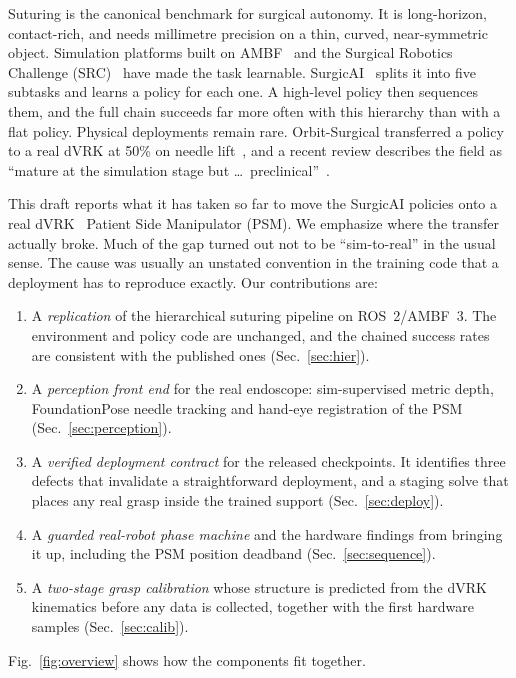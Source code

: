 \documentclass[letterpaper, 10 pt, conference]{ieeeconf}  %
\begin{document}
Suturing is the canonical benchmark for surgical autonomy. It is long-horizon,
contact-rich, and needs millimetre precision on a thin, curved,
near-symmetric object. Simulation platforms built on AMBF~\cite{munawar2019ambf}
and the Surgical Robotics Challenge (SRC)~\cite{munawar2022src} have made the
task learnable. SurgicAI~\cite{wu2024surgicai} splits it into five subtasks and
learns a policy for each one. A high-level policy then sequences them, and the
full chain succeeds far more often with this hierarchy than with a flat policy.
Physical deployments remain rare. Orbit-Surgical transferred a policy to a real
dVRK at 50\% on needle lift~\cite{yu2024orbit}, and a recent review describes the
field as ``mature at the simulation stage but \ldots\ preclinical''~\cite{review2026rl}.

This draft reports what it has taken so far to move the SurgicAI policies onto a
real dVRK~\cite{kazanzides2014dvrk} Patient Side Manipulator (PSM). We emphasize
where the transfer actually broke. Much of the gap turned out not to be
``sim-to-real'' in the usual sense. The cause was usually an unstated convention
in the training code that a deployment has to reproduce exactly. Our
contributions are:
\begin{enumerate}
\item A \emph{replication} of the hierarchical suturing pipeline on ROS~2/AMBF~3.
      The environment and policy code are unchanged, and the chained success rates
      are consistent with the published ones (Sec.~\ref{sec:hier}).
\item A \emph{perception front end} for the real endoscope: sim-supervised metric
      depth, FoundationPose needle tracking and hand-eye registration of the PSM
      (Sec.~\ref{sec:perception}).
\item A \emph{verified deployment contract} for the released checkpoints. It
      identifies three defects that invalidate a straightforward deployment, and
      a staging solve that places any real grasp inside the trained support
      (Sec.~\ref{sec:deploy}).
\item A \emph{guarded real-robot phase machine} and the hardware findings from
      bringing it up, including the PSM position deadband
      (Sec.~\ref{sec:sequence}).
\item A \emph{two-stage grasp calibration} whose structure is predicted from the
      dVRK kinematics before any data is collected, together with the first
      hardware samples (Sec.~\ref{sec:calib}).
\end{enumerate}
Fig.~\ref{fig:overview} shows how the components fit together.
\end{document}
